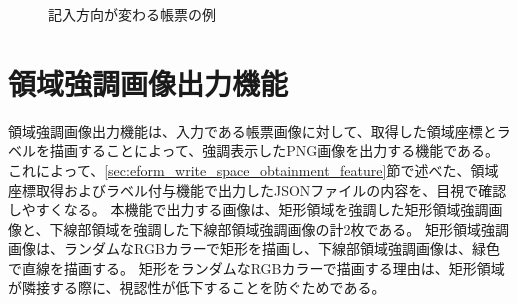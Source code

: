 \begin{figure}[t]
    \begin{center}
        \caption{記入方向が変わる帳票の例}
        \label{fig:label_order}
    \end{center}
\end{figure}

\section{領域強調画像出力機能}\label{sec:highlighted_area_image_output}
領域強調画像出力機能は、入力である帳票画像に対して、取得した領域座標とラベルを描画することによって、強調表示したPNG画像を出力する機能である。
これによって、\ref{sec:eform_write_space_obtainment_feature}節で述べた、領域座標取得およびラベル付与機能で出力したJSONファイルの内容を、目視で確認しやすくなる。
本機能で出力する画像は、矩形領域を強調した矩形領域強調画像と、下線部領域を強調した下線部領域強調画像の計2枚である。
矩形領域強調画像は、ランダムなRGBカラーで矩形を描画し、下線部領域強調画像は、緑色で直線を描画する。
矩形をランダムなRGBカラーで描画する理由は、矩形領域が隣接する際に、視認性が低下することを防ぐためである。

